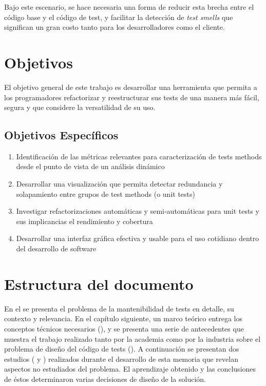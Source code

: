 \par Bajo este escenario, se hace necesaria una forma de reducir esta brecha entre el código base y el código de test, y facilitar la detección de \emph{test smells} que significan un gran costo tanto para los desarrolladores como el cliente.


\newpage
\section{Objetivos}
\par El objetivo general de este trabajo es desarrollar una herramienta que permita a los programadores refactorizar y reestructurar sus tests de una manera más fácil, segura y que considere la versatilidad de su uso.

\subsection*{Objetivos Específicos}
\begin{enumerate}
\item Identificación de las métricas relevantes para caracterización de tests methods desde el punto de vista de un análisis dinámico
\item Desarrollar una visualización que permita detectar redundancia y solapamiento entre grupos de test methods (o unit tests)
\item Investigar refactorizaciones automáticas y semi-automáticas para unit tests y sus implicancias el rendimiento y cobertura
\item Desarrollar una interfaz gráfica efectiva y usable para el uso cotidiano dentro del desarrollo de software
\end{enumerate}

\section{Estructura del documento}

\par En el  se presenta el problema de la mantenibilidad de tests en detalle, su contexto y relevancia. En el capítulo siguiente, un marco teórico entrega los conceptos técnicos necesarios (), y se presenta una serie de antecedentes que muestra el trabajo realizado tanto por la academia como por la industria sobre el problema de diseño del código de tests (). A continuación se presentan dos estudios ( y ) realizados durante el desarrollo de esta memoria que revelan aspectos no estudiados del problema. El aprendizaje obtenido y las conclusiones de éstos determinaron varias decisiones de diseño de la solución. 

